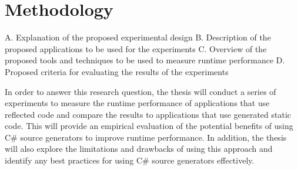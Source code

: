 \chapter{Methodology}
A. Explanation of the proposed experimental design
B. Description of the proposed applications to be used for the experiments
C. Overview of the proposed tools and techniques to be used to measure runtime performance
D. Proposed criteria for evaluating the results of the experiments

In order to answer this research question, the thesis will conduct a series of experiments to measure the runtime performance of applications that use reflected code and compare the results to applications that use generated static code. This will provide an empirical evaluation of the potential benefits of using C\# source generators to improve runtime performance. In addition, the thesis will also explore the limitations and drawbacks of using this approach and identify any best practices for using C\# source generators effectively.